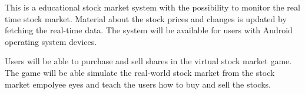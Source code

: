 This is a educational stock market system with the possibility to monitor the real time stock market. Material about the stock prices and changes is updated by fetching the real-time data. The system will be available for users with Android operating system devices.

Users will be able to purchase and sell shares in the virtual stock market game. The game will be able simulate the real-world stock market from the stock market empolyee eyes and teach the users how to buy and sell the stocks.